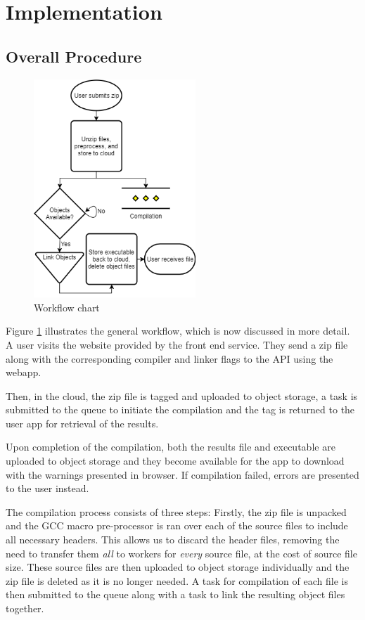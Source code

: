 \documentclass[conference]{IEEEtran}
\begin{document}

\section{Implementation}
\subsection{Overall Procedure}
\begin{figure}[ht] %
    \centering
    \includegraphics[width=2.4in]{WorkArchitecture.png}
    \caption{Workflow chart}
    \label{fig:overview}
\end{figure}

Figure \ref{fig:overview} illustrates the general workflow, which is now
discussed in more detail. A user visits the website provided by the front end
service. They send a zip file along with the corresponding compiler and linker
flags to the API using the webapp.

Then, in the cloud, the zip file is tagged and uploaded to object storage, a
task is submitted to the queue to initiate the compilation and the tag is
returned to the user app for retrieval of the results.

Upon completion of the compilation, both the results file and executable are
uploaded to object storage and they become available for the app to
download with the warnings presented in browser. If compilation failed, errors
are presented to the user instead.

The compilation process consists of three steps:
Firstly, the zip file is unpacked and the GCC macro pre-processor is ran over
each of the source files to include all necessary headers. This allows us to
discard the header files, removing the need to transfer them \emph{all} to
workers for \emph{every} source file, at the cost of source file size. These
source files are then uploaded to object storage individually and the zip file
is deleted as it is no longer needed. A task for compilation of each file is
then submitted to the queue along with a task to link the resulting object
files together.
\end{document}
